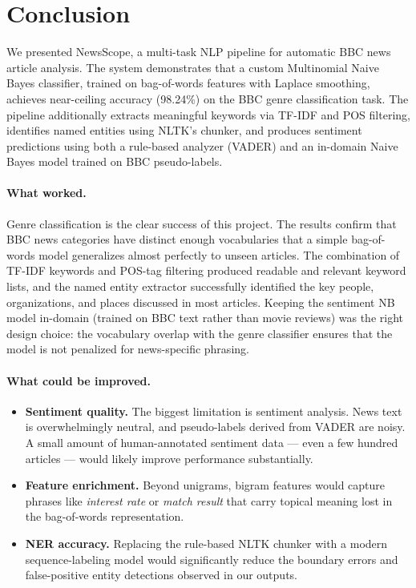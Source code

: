\section{Conclusion}
\label{sec:conclusion}

We presented NewsScope, a multi-task NLP pipeline for automatic BBC news article analysis. The system demonstrates that a custom Multinomial Naive Bayes classifier, trained on bag-of-words features with Laplace smoothing, achieves near-ceiling accuracy (98.24\%) on the BBC genre classification task. The pipeline additionally extracts meaningful keywords via TF-IDF and POS filtering, identifies named entities using NLTK's chunker, and produces sentiment predictions using both a rule-based analyzer (VADER) and an in-domain Naive Bayes model trained on BBC pseudo-labels.

\paragraph{What worked.}
Genre classification is the clear success of this project. The results confirm that BBC news categories have distinct enough vocabularies that a simple bag-of-words model generalizes almost perfectly to unseen articles. The combination of TF-IDF keywords and POS-tag filtering produced readable and relevant keyword lists, and the named entity extractor successfully identified the key people, organizations, and places discussed in most articles. Keeping the sentiment NB model in-domain (trained on BBC text rather than movie reviews) was the right design choice: the vocabulary overlap with the genre classifier ensures that the model is not penalized for news-specific phrasing.

\paragraph{What could be improved.}

\begin{itemize}
    \item \textbf{Sentiment quality.} The biggest limitation is sentiment analysis. News text is overwhelmingly neutral, and pseudo-labels derived from VADER are noisy. A small amount of human-annotated sentiment data — even a few hundred articles — would likely improve performance substantially.

    \item \textbf{Feature enrichment.} Beyond unigrams, bigram features would capture phrases like \textit{interest rate} or \textit{match result} that carry topical meaning lost in the bag-of-words representation.

    \item \textbf{NER accuracy.} Replacing the rule-based NLTK chunker with a modern sequence-labeling model would significantly reduce the boundary errors and false-positive entity detections observed in our outputs.
\end{itemize}

